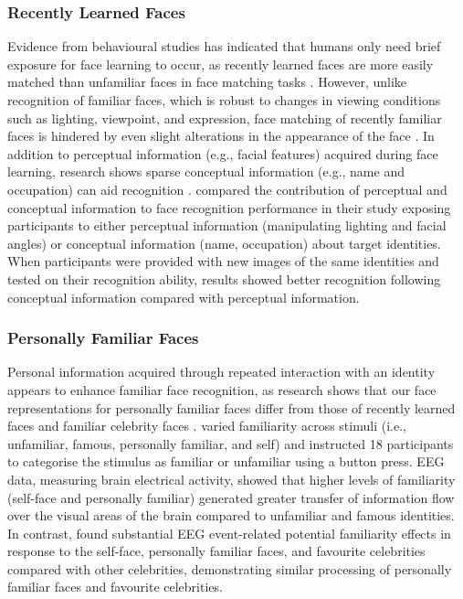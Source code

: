 \documentclass[
  10pt,
  letterpaper,
]{article}
\begin{document}
\subsubsection{Recently Learned Faces}\label{recently-learned-faces}

Evidence from behavioural studies has indicated that humans only need
brief exposure for face learning to occur, as recently learned faces are
more easily matched than unfamiliar faces in face matching tasks
\citep{dowsett2016a, kramer2017a, murphy2015a, quek2021a}. However,
unlike recognition of familiar faces, which is robust to changes in
viewing conditions such as lighting, viewpoint, and expression, face
matching of recently familiar faces is hindered by even slight
alterations in the appearance of the face
\citep{burton2011a, redfern2019a, megraya2008a, white2016a}. In addition
to perceptual information (e.g., facial features) acquired during face
learning, research shows sparse conceptual information (e.g., name and
occupation) can aid recognition \citep{oruc2019a, schwartz2019a}.
\citet{schwartz2016a} compared the contribution of perceptual and
conceptual information to face recognition performance in their study
exposing participants to either perceptual information (manipulating
lighting and facial angles) or conceptual information (name, occupation)
about target identities. When participants were provided with new images
of the same identities and tested on their recognition ability, results
showed better recognition following conceptual information compared with
perceptual information.

\subsubsection{Personally Familiar
Faces}\label{personally-familiar-faces}

Personal information acquired through repeated interaction with an
identity appears to enhance familiar face recognition, as research shows
that our face representations for personally familiar faces differ from
those of recently learned faces and familiar celebrity faces
\citep{cloutier2011a, ramon2017a, rooney2012a}.
\citet{karimi-rouzbahani2021a} varied familiarity across stimuli (i.e.,
unfamiliar, famous, personally familiar, and self) and instructed 18
participants to categorise the stimulus as familiar or unfamiliar using
a button press. EEG data, measuring brain electrical activity, showed
that higher levels of familiarity (self-face and personally familiar)
generated greater transfer of information flow over the visual areas of
the brain compared to unfamiliar and famous identities. In contrast,
\citet{wiese2021a} found substantial EEG event-related potential
familiarity effects in response to the self-face, personally familiar
faces, and favourite celebrities compared with other celebrities,
demonstrating similar processing of personally familiar faces and
favourite celebrities.
\end{document}
